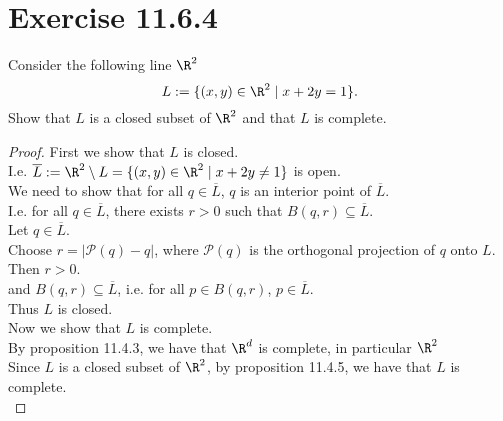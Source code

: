 \documentclass[problem]{classnotes}
\begin{document}
    \section{Exercise 11.6.4}
    \begin{problem}
        Consider the following line $\R^2$
        $$L:=\{(x,y) \in \R^2 \mid x+2y = 1\}.$$
        Show that $L$ is a closed subset of $\R^2$ and that $L$ is complete.
    \end{problem}

    \begin{proof}
        First we show that $L$ is closed. \\
        I.e. $\overline{L} := \R^2 \setminus L = \{(x,y) \in \R^2 \mid x+2y \ne 1\}$ is open. \\
        We need to show that for all $q \in \overline{L}$, $q$ is an interior point of $\overline{L}$. \\
        I.e. for all $q \in \overline{L}$, there exists $r > 0$ such that $B(q,r) \subseteq \overline{L}$. \\
        Let $q \in \overline{L}$. \\
        Choose $r = |\mathcal{P}(q) - q|$, where $\mathcal{P}(q)$ is the orthogonal projection of $q$ onto $L$. \\
        Then $r > 0$. \\
        and $B(q,r) \subseteq \overline{L}$, i.e. for all $p \in B(q,r)$, $p \in \overline{L}$. \\
        Thus $L$ is closed. \\
        
        Now we show that $L$ is complete. \\
        By proposition 11.4.3, we have that $\R^d$ is complete, in particular $\R^2$ \\
        Since $L$ is a closed subset of $\R^2$, by proposition 11.4.5, we have that $L$ is complete. \\


\end{proof}
\end{document}
